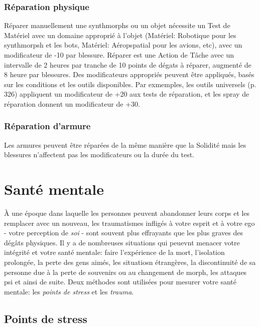 \subsubsection{Réparation physique} 

Réparer manuellement une synthmorphs ou un objet nécessite un Test de Matériel avec un domaine approprié à l'objet (Matériel: Robotique pour les synthmorpsh et les bots, Matériel: Aéropspatial pour les avions, etc), avec un modificateur de -10 par blessure. Réparer est une Action de Tâche avec un intervalle de 2 heures par tranche de 10 points de dégats à réparer, augmenté de 8 heure par blessures. Des modificateurs appropriés peuvent être appliqués, basés sur les conditions et les outils disponibles. Par exmemples, les outils universels (p. 326) appliquent un modificateur de +20 aux tests de réparation, et les spray de réparation donnent un modificateur de +30. 

\subsubsection{Réparation d'armure} 

Les armures peuvent être réparées de la même manière que la Solidité mais les blessures n'affectent pas les modificateurs ou la durée du test. 

\section{Santé mentale} \label{sec:mental-health} 

À une époque dans laquelle les personnes peuvent abandonner leurs corps et les remplacer avec un nouveau, les traumatismes infligés à votre esprit et à votre ego - votre perception de \emph{soi} - sont souvent plus effrayants que les plus graves des dégâts physiques. Il y a de nombreuses situations qui peuevnt menacer votre intégrité et votre santé mentale: faire l'expérience de la mort, l'isolation prolongée, la perte des gens aimés, les situatiosn étrangères, la discontinuité de sa personne due à la perte de souvenirs ou au changement de morph, les attaques psi et ainsi de suite. Deux méthodes sont utilisées pour mesurer votre santé mentale: les \emph{points de stress} et les \emph{trauma}. 



\subsection{Points de stress} \label{sec:stress-points} 

